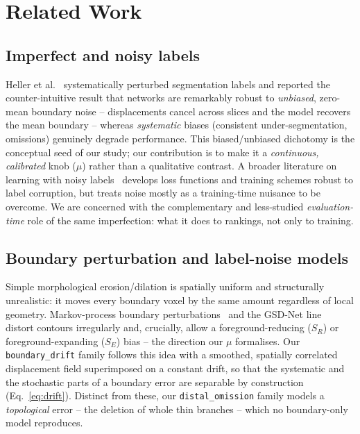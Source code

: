 \documentclass[
    bookmarks, bookmarksnumbered, bookmarksopen,
    colorlinks=true, citecolor=blue, linkcolor=blue, urlcolor=blue
]{techrep}
\begin{document}
\chapter{Related Work}\label{sec:related}
\section{Imperfect and noisy labels}
Heller et al.~\cite{heller2018imperfect} systematically perturbed segmentation labels and
reported the counter-intuitive result that networks are remarkably robust to
\emph{unbiased}, zero-mean boundary noise -- displacements cancel across slices and the
model recovers the mean boundary -- whereas \emph{systematic} biases (consistent
under-segmentation, omissions) genuinely degrade performance. This biased/unbiased
dichotomy is the conceptual seed of our study; our contribution is to make it a
\emph{continuous, calibrated} knob ($\mu$) rather than a qualitative contrast. A broader
literature on learning with noisy labels~\cite{karimi2020noisy} develops loss functions
and training schemes robust to label corruption, but treats noise mostly as a training-time
nuisance to be overcome. We are concerned with the complementary and less-studied
\emph{evaluation-time} role of the same imperfection: what it does to rankings, not only to
training.

\section{Boundary perturbation and label-noise models}
Simple morphological erosion/dilation is spatially uniform and structurally unrealistic: it
moves every boundary voxel by the same amount regardless of local geometry. Markov-process
boundary perturbations~\cite{yao2023markov} and the GSD-Net line~\cite{gsdnet2025} distort
contours irregularly and, crucially, allow a foreground-reducing ($S_R$) or
foreground-expanding ($S_E$) bias -- the direction our $\mu$ formalises. Our
\texttt{boundary\_drift} family follows this idea with a smoothed, spatially correlated
displacement field superimposed on a constant drift, so that the systematic and the
stochastic parts of a boundary error are separable by construction
(Eq.~\eqref{eq:drift}). Distinct from these, our \texttt{distal\_omission} family models a
\emph{topological} error -- the deletion of whole thin branches -- which no boundary-only
model reproduces.
\end{document}
